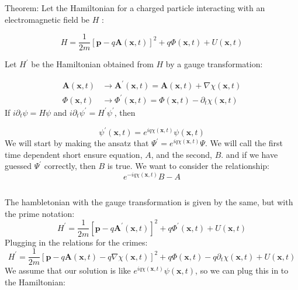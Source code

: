 \documentclass[12pt]{article}
\begin{document}
Theorem: Let the Hamiltonian for a charged particle interacting with an electromagnetic field be $H$ :

$$
H=\frac{1}{2 m}[\mathbf{p}-q \mathbf{A}(\mathbf{x}, t)]^{2}+q \Phi(\mathbf{x}, t)+U(\mathbf{x}, t)
$$

Let $H^{\prime}$ be the Hamiltonian obtained from $H$ by a gauge transformation:

$$
\begin{aligned}
\mathbf{A}(\mathbf{x}, t) & \rightarrow \mathbf{A}^{\prime}(\mathbf{x}, t)=\mathbf{A}(\mathbf{x}, t)+\nabla \chi(\mathbf{x}, t) \\
\Phi(\mathbf{x}, t) & \rightarrow \Phi^{\prime}(\mathbf{x}, t)=\Phi(\mathbf{x}, t)-\partial_{t} \chi(\mathbf{x}, t)
\end{aligned}
$$
If $i \partial_{t} \psi=H \psi$ and $i \partial_{t} \psi^{\prime}=H^{\prime} \psi^{\prime}$, then

$$
\psi^{\prime}(\mathbf{x}, t)=e^{i q \chi(\mathbf{x}, t)} \psi(\mathbf{x}, t)
$$
We will start by making the ansatz that $\Psi^{\prime} = e^{i q \chi(\mathbf{x}, t)} \Psi$.
We will call the first time dependent short ensure equation, $A$, and the second, $B$.
and if we have guessed $\Psi^{\prime}$ correctly, then $B$ is true. 
We want to consider the relationship:
\begin{equation}
  e^{-i q \chi(\mathbf{x}, t)} B - A
\end{equation}

\subsection{}
The hambletonian with the gauge transformation is given by the same, but with the prime notation:
\begin{equation}
  H^{\prime}=\frac{1}{2 m}[\mathbf{p}-q \mathbf{A}^{\prime}(\mathbf{x}, t)]^{2}+q \Phi^{\prime}(\mathbf{x}, t)+U(\mathbf{x}, t)
\end{equation}
Plugging in the relations for the crimes:
\begin{equation}
  H^{\prime}=\frac{1}{2 m}[\mathbf{p}-q \mathbf{A}(\mathbf{x}, t) - q \nabla \chi(\mathbf{x}, t)]^{2}+q \Phi(\mathbf{x}, t) - q \partial_{t} \chi(\mathbf{x}, t) + U(\mathbf{x}, t)
\end{equation}
We assume that our solution is like $e^{i q \chi(\mathbf{x}, t)} \psi(\mathbf{x}, t)$, so we can plug this in to the Hamiltonian:
\end{document}
